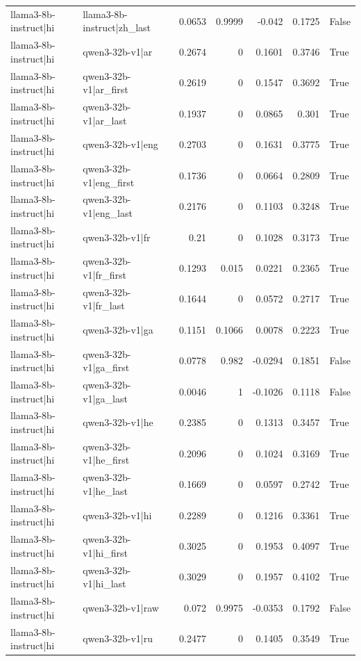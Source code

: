 \begin{table}
\begin{tabular}{l l r r r r l}
llama3-8b-instruct|hi & llama3-8b-instruct|zh_last & 0.0653 & 0.9999 & -0.042 & 0.1725 & False \\
llama3-8b-instruct|hi & qwen3-32b-v1|ar & 0.2674 & 0 & 0.1601 & 0.3746 & True \\
llama3-8b-instruct|hi & qwen3-32b-v1|ar_first & 0.2619 & 0 & 0.1547 & 0.3692 & True \\
llama3-8b-instruct|hi & qwen3-32b-v1|ar_last & 0.1937 & 0 & 0.0865 & 0.301 & True \\
llama3-8b-instruct|hi & qwen3-32b-v1|eng & 0.2703 & 0 & 0.1631 & 0.3775 & True \\
llama3-8b-instruct|hi & qwen3-32b-v1|eng_first & 0.1736 & 0 & 0.0664 & 0.2809 & True \\
llama3-8b-instruct|hi & qwen3-32b-v1|eng_last & 0.2176 & 0 & 0.1103 & 0.3248 & True \\
llama3-8b-instruct|hi & qwen3-32b-v1|fr & 0.21 & 0 & 0.1028 & 0.3173 & True \\
llama3-8b-instruct|hi & qwen3-32b-v1|fr_first & 0.1293 & 0.015 & 0.0221 & 0.2365 & True \\
llama3-8b-instruct|hi & qwen3-32b-v1|fr_last & 0.1644 & 0 & 0.0572 & 0.2717 & True \\
llama3-8b-instruct|hi & qwen3-32b-v1|ga & 0.1151 & 0.1066 & 0.0078 & 0.2223 & True \\
llama3-8b-instruct|hi & qwen3-32b-v1|ga_first & 0.0778 & 0.982 & -0.0294 & 0.1851 & False \\
llama3-8b-instruct|hi & qwen3-32b-v1|ga_last & 0.0046 & 1 & -0.1026 & 0.1118 & False \\
llama3-8b-instruct|hi & qwen3-32b-v1|he & 0.2385 & 0 & 0.1313 & 0.3457 & True \\
llama3-8b-instruct|hi & qwen3-32b-v1|he_first & 0.2096 & 0 & 0.1024 & 0.3169 & True \\
llama3-8b-instruct|hi & qwen3-32b-v1|he_last & 0.1669 & 0 & 0.0597 & 0.2742 & True \\
llama3-8b-instruct|hi & qwen3-32b-v1|hi & 0.2289 & 0 & 0.1216 & 0.3361 & True \\
llama3-8b-instruct|hi & qwen3-32b-v1|hi_first & 0.3025 & 0 & 0.1953 & 0.4097 & True \\
llama3-8b-instruct|hi & qwen3-32b-v1|hi_last & 0.3029 & 0 & 0.1957 & 0.4102 & True \\
llama3-8b-instruct|hi & qwen3-32b-v1|raw & 0.072 & 0.9975 & -0.0353 & 0.1792 & False \\
llama3-8b-instruct|hi & qwen3-32b-v1|ru & 0.2477 & 0 & 0.1405 & 0.3549 & True \\

\end{tabular}
\end{table}

